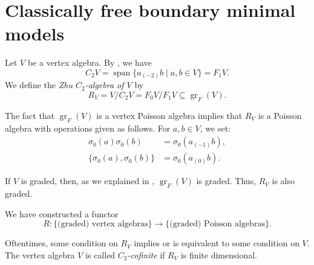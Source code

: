 \documentclass[a4paper, 12pt, reqno]{amsart}
\theoremstyle{remark}
\DeclareMathOperator{\gr}{gr}
\DeclareMathOperator{\vspan}{span}
\begin{document}
\section{Classically free boundary minimal models}
\label{sec:class-free-bound}

Let $V$ be a vertex algebra.
By \cite[Lemma 2.9]{li_abelianizing_2005}, we have
\begin{equation*}
  C_2V = \vspan\{a_{(-2)}b \mid a, b \in V\} = F_1V.
\end{equation*}
We define the \emph{Zhu $C_2$-algebra of $V$} by
\begin{equation*}
  R_V = V/C_2V = F_0V/F_1V \subseteq \gr_F(V).
\end{equation*}

The fact that $\gr_F(V)$ is a vertex Poisson algebra implies that $R_V$ is a Poisson algebra with operations given as follows.
For $a, b \in V$, we set:
\begin{align*}
  \sigma_0(a)\sigma_0(b) &= \sigma_0(a_{(-1)}b), \\
  \{\sigma_0(a), \sigma_0(b)\} &= \sigma_0(a_{(0)}b).
\end{align*}

If $V$ is graded, then, as we explained in , $\gr_F(V)$ is graded.
Thus, $R_V$ is also graded.

We have constructed a functor
\begin{equation*}
  R: \{\text{(graded) vertex algebras}\} \to \{\text{(graded) Poisson algebras}\}.
\end{equation*}

Oftentimes, some condition on $R_V$ implies or is equivalent to some condition on $V$.
The vertex algebra $V$ is called \emph{$C_2$-cofinite} if $R_V$ is finite dimensional.
\end{document}
